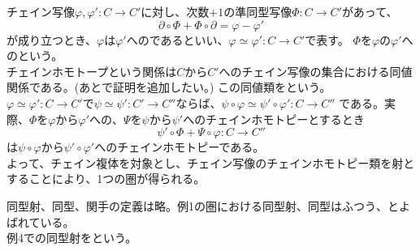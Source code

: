 \documentclass[dvipdfmx,a4paper,11pt]{jsarticle}
\begin{document}
\begin{tcolorbox}[title = 例4]
  チェイン写像$\varphi,\varphi':C\to C'$に対し、次数$+1$の準同型写像$\Phi : C\to C'$があって、
  \begin{equation*}
    \partial \circ \Phi + \Phi \circ \partial = \varphi - \varphi'
  \end{equation*}
  が成り立つとき、$\varphi$は$\varphi'$へのであるといい、$\varphi \simeq \varphi' : C\to C'$で表す。
  $\Phi$を$\varphi$の$\varphi'$へのという。\\
  チェインホモトープという関係は$C$から$C'$へのチェイン写像の集合における同値関係である。(あとで証明を追加したい。)
  この同値類をという。\\
  $\varphi\simeq \varphi' : C\to C'$で$\psi \simeq \psi' :C' \to C''$ならば、$\psi \circ \varphi \simeq \psi' \circ \varphi' : C\to C''$
  である。実際、$\Phi$を$\varphi$から$\varphi'$への、$\Psi$を$\psi$から$\psi'$へのチェインホモトピーとするとき
  \begin{equation*}
    \psi'\circ \Phi + \Psi \circ \varphi : C\to C''
  \end{equation*}
  は$\psi \circ \varphi$から$\psi'\circ \varphi'$へのチェインホモトピーである。\\
  よって、チェイン複体を対象とし、チェイン写像のチェインホモトピー類を射とすることにより、1つの圏が得られる。
\end{tcolorbox}
同型射、同型、関手の定義は略。例1の圏における同型射、同型はふつう、とよばれている。\\
例4での同型射をという。
\end{document}
